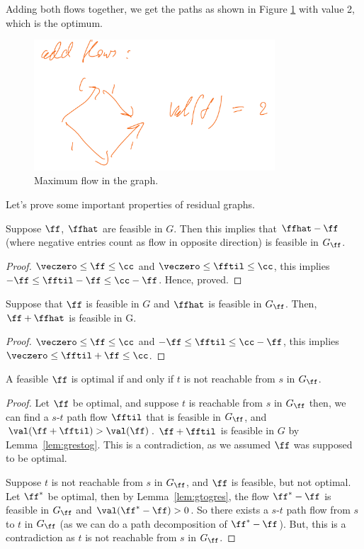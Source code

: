 Adding both flows together, we get the paths as shown in Figure \ref{fig:ex13} with value 2, which is the optimum.
\begin{figure}[H]
 \centering
  \includegraphics[width=90mm,scale=0.5]{fig/fig13_lec10.PNG}
  \caption{Maximum flow in the graph.}\label{fig:ex13}
\end{figure}
Let's prove some important properties of residual graphs.
\begin{lemma}
    \label{lem:gtogres}
Suppose   \(\ff\), \(\ffhat\) are feasible in $G$. Then this implies that \(\ffhat - \ff\)  (where negative entries count as flow in opposite direction) is feasible in \(G_{\ff}\).
\end{lemma}
\begin{proof}
\(\veczero \leq \ff \leq \cc\) and  \(\veczero \leq \fftil \leq \cc\), this implies \(-\ff \leq \fftil - \ff \leq \cc - \ff \). Hence, proved.
\end{proof}
\begin{lemma}
  \label{lem:grestog}
Suppose that \(\ff\) is feasible in \(G\) and \(\ffhat\) is feasible in \(G_{\ff}\). Then, \(\ff + \ffhat\) is feasible in G.
\end{lemma}
\begin{proof}
\(\veczero \leq \ff \leq \cc\) and  \(- \ff \leq \fftil \leq \cc - \ff \), this implies \(\veczero \leq \fftil + \ff \leq \cc\).
\end{proof}

\begin{lemma}
A feasible \(\ff\) is optimal if and only if \(t\) is not reachable from \(s\) in \(G_{\ff}\).
\end{lemma}
\begin{proof}
 Let \(\ff\) be optimal, and suppose $t$ is reachable from $s$ in \(G_{\ff}\)
 then, we can find a $s$-$t$ path flow \(\fftil\) that is feasible in \(G_{\ff}\),
 and \(\val(\ff + \fftil) > \val(\ff)\). \(\ff +
 \fftil\) is feasible in $G$ by Lemma~\ref{lem:grestog}. This is a
 contradiction, as we assumed \(\ff\) was supposed to be optimal.

 Suppose $t$ is not reachable from $s$ in \(G_{\ff}\), and \(\ff\) is
 feasible, but not optimal. Let \(\ff^*\) be optimal, then by
 Lemma~\ref{lem:gtogres}, the flow \(\ff^*-\ff\) is feasible in \(G_{\ff}\) and \(\val(\ff^* - \ff) > 0\). So there exists a $s$-$t$ path flow from $s$ to $t$ in \(G_{\ff}\) (as we can do a path decomposition of \(\ff^* - \ff\)). But, this is a contradiction as $t$ is not reachable from $s$ in \(G_{\ff}\).
\end{proof}

